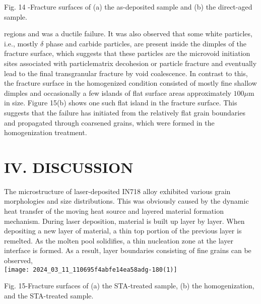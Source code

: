 \documentclass[10pt]{article}
\begin{document}
Fig. 14 -Fracture surfaces of (a) the as-deposited sample and (b) the direct-aged sample.

regions and was a ductile failure. It was also observed that some white particles, i.e., mostly $\delta$ phase and carbide particles, are present inside the dimples of the fracture surface, which suggests that these particles are the microvoid initiation sites associated with particlematrix decohesion or particle fracture and eventually lead to the final transgranular fracture by void coalescence. In contrast to this, the fracture surface in the homogenized condition consisted of mostly fine shallow dimples and occasionally a few islands of flat surface areas approximately $100 \mu \mathrm{m}$ in size. Figure 15(b) shows one such flat island in the fracture surface. This suggests that the failure has initiated from the relatively flat grain boundaries and propagated through coarsened grains, which were formed in the homogenization treatment.

\section*{IV. DISCUSSION}
The microstructure of laser-deposited IN718 alloy exhibited various grain morphologies and size distributions. This was obviously caused by the dynamic heat transfer of the moving heat source and layered material formation mechanism. During laser deposition, material is built up layer by layer. When depositing a new layer of material, a thin top portion of the previous layer is remelted. As the molten pool solidifies, a thin nucleation zone at the layer interface is formed. As a result, layer boundaries consisting of fine grains can be observed,\\
\texttt{[image: 2024\_03\_11\_110695f4abfe14ea58adg-180(1)]}

Fig. 15-Fracture surfaces of (a) the STA-treated sample, (b) the homogenization, and the STA-treated sample.
\end{document}
